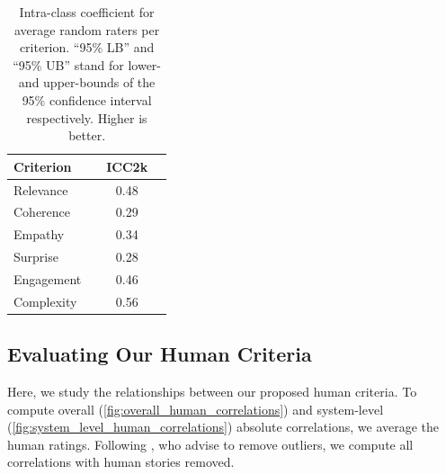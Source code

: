 \begin{table}[!h]
\centering
\begin{tabular}{lccc}
\toprule
    \textbf{Criterion} & \color{gray}{\textbf{95\% LB}} & \textbf{ICC2k} & \color{gray}{\textbf{95\% UB}} \\
\midrule
    Relevance & \color{gray}{0.18} & 0.48 &  \color{gray}{0.65} \\
    Coherence & \color{gray}{0.10} & 0.29 &  \color{gray}{0.48} \\
    Empathy & \color{gray}{0.25} & 0.34 & \color{gray}{0.41} \\
    Surprise & \color{gray}{0.16} & 0.28 & \color{gray}{0.37} \\
    Engagement & \color{gray}{0.34} & 0.46 & \color{gray}{0.55} \\
    Complexity & \color{gray}{0.48} & 0.56 & \color{gray}{0.63} \\
\bottomrule
\end{tabular}
\caption{Intra-class coefficient for average random raters per criterion. ``95\% LB'' and ``95\% UB'' stand for lower- and upper-bounds of the 95\% confidence interval respectively. Higher is better.}
\label{tab:icc_annotations_hanna}
\end{table}

\subsection{Evaluating Our Human Criteria}
\label{sub:evaluating_human_criteria}

Here, we study the relationships between our proposed human criteria. To compute overall (\autoref{fig:overall_human_correlations}) and system-level (\autoref{fig:system_level_human_correlations}) absolute correlations, we average the human ratings. Following \citet{mathur-etal-2020-tangled}, who advise to remove outliers, we compute all correlations with human stories removed.

